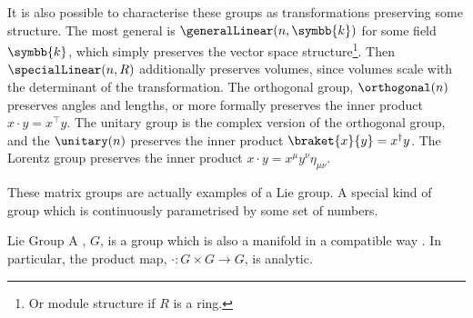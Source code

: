 \documentclass[fleqn]{NotesClass}
\renewcommand{\field}{\symbb{k}}
\newcommand{\trans}{\top}
\newcommand{\hermit}{\dagger}
\newcommand{\minkowskiMetric}{\eta}
\begin{document}
    It is also possible to characterise these groups as transformations preserving some structure.
    The most general is \(\generalLinear(n, \field)\) for some field \(\field\), which simply preserves the vector space structure\footnote{Or module structure if \(R\) is a ring.}.
    Then \(\specialLinear(n, R)\) additionally preserves volumes, since volumes scale with the determinant of the transformation.
    The orthogonal group, \(\orthogonal(n)\) preserves angles and lengths, or more formally preserves the inner product \(x \cdot y = x^\trans y\).
    The unitary group is the complex version of the orthogonal group, and the \(\unitary(n)\) preserves the inner product \(\braket{x}{y} = x^\hermit y\).
    The Lorentz group preserves the inner product \(x \cdot y = x^\mu y^\nu \minkowskiMetric_{\mu\nu}\).
    
    These matrix groups are actually examples of a Lie group.
    A special kind of group which is continuously parametrised by some set of numbers.
    \begin{dfn}{Lie Group}{}
        A , \(G\), is a group which is also a manifold in a compatible way \cite[87]{san-martin-lie-groups}.
        In particular, the product map, \(\cdot \colon G \times G \to G\), is analytic.
    \end{dfn}
    
\end{document}
